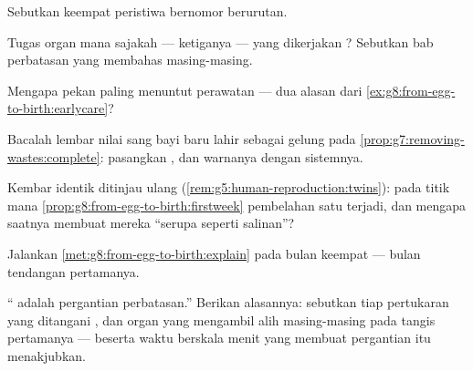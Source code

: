 \begin{exercise}[$\star$]\label{exo:g8:from-egg-to-birth:6}
Sebutkan keempat peristiwa bernomor  berurutan.
\end{exercise}

\begin{exercise}[$\star\star$]\label{exo:g8:from-egg-to-birth:7}
Tugas organ mana sajakah --- ketiganya --- yang dikerjakan
? Sebutkan bab perbatasan yang membahas masing-masing.
\end{exercise}

\begin{exercise}[$\star\star$]\label{exo:g8:from-egg-to-birth:8}
Mengapa pekan  paling menuntut perawatan --- dua
alasan dari \cref{ex:g8:from-egg-to-birth:earlycare}?
\end{exercise}

\begin{exercise}[$\star\star$]\label{exo:g8:from-egg-to-birth:9}
Bacalah lembar nilai sang bayi baru lahir sebagai gelung pada
\cref{prop:g7:removing-wastes:complete}: pasangkan
,  dan warnanya dengan sistemnya.
\end{exercise}

\begin{exercise}[$\star\star$]\label{exo:g8:from-egg-to-birth:10}
Kembar identik ditinjau ulang
(\cref{rem:g5:human-reproduction:twins}): pada titik mana
\cref{prop:g8:from-egg-to-birth:firstweek} pembelahan satu
 terjadi, dan mengapa saatnya membuat mereka
``serupa seperti salinan''?
\end{exercise}

\begin{exercise}[$\star\star$]\label{exo:g8:from-egg-to-birth:11}
Jalankan \cref{met:g8:from-egg-to-birth:explain} pada bulan
keempat --- bulan tendangan pertamanya.
\end{exercise}

\begin{exercise}[$\star\star\star$]\label{exo:g8:from-egg-to-birth:12}
`` adalah pergantian perbatasan.'' Berikan
alasannya: sebutkan tiap pertukaran yang ditangani
, dan organ yang mengambil alih masing-masing
pada tangis pertamanya --- beserta waktu berskala menit yang
membuat pergantian itu menakjubkan.
\end{exercise}

